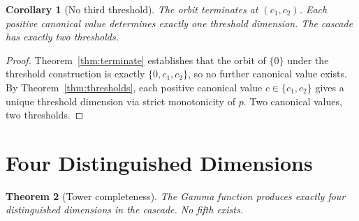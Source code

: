 \documentclass[11pt,a4paper]{article}
\newtheorem{theorem}{Theorem}[section]
\newtheorem{corollary}[theorem]{Corollary}
\begin{document}
\begin{corollary}[No third threshold]\label{cor:no-third-threshold}
The orbit terminates at $(c_1, c_2)$. Each positive canonical value
determines exactly one threshold dimension. The cascade has exactly two
thresholds.
\end{corollary}

\begin{proof}
Theorem~\ref{thm:terminate} establishes that the orbit of $\{0\}$ under
the threshold construction is exactly $\{0, c_1, c_2\}$, so no further
canonical value exists. By Theorem~\ref{thm:thresholds}, each positive
canonical value $c\in\{c_1, c_2\}$ gives a unique threshold dimension
via strict monotonicity of $p$. Two canonical values, two thresholds.
\end{proof}

\section{Four Distinguished Dimensions}\label{sec:four-distinguished-dimensions}

\begin{theorem}[Tower completeness]\label{thm:tower}
The Gamma function produces exactly four distinguished dimensions in the
cascade. No fifth exists.
\end{theorem}
\end{document}
